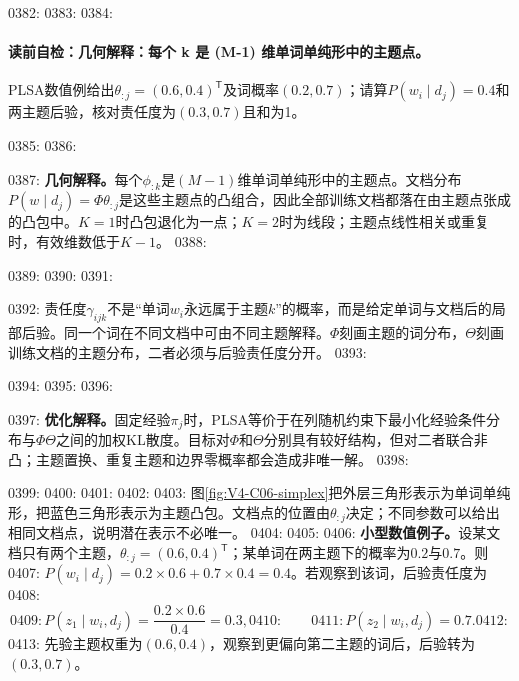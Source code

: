 0382: \label{struct:V4-C06-CH14}
0383: %
0384: \paragraph{读前自检：几何解释：每个 k 是 (M-1) 维单词单纯形中的主题点。}PLSA数值例给出$\theta_{:j}=(0.6,0.4)^{\mathsf T}$及词概率$(0.2,0.7)$；请算$P(w_i\mid d_j)=0.4$和两主题后验，核对责任度为$(0.3,0.7)$且和为1。\par
0385: 
0386: \begin{geometrybox}
0387: \textbf{几何解释。}每个$\phi_{:k}$是$(M-1)$维单词单纯形中的主题点。文档分布$P(w\mid d_j)=\Phi\theta_{:j}$是这些主题点的凸组合，因此全部训练文档都落在由主题点张成的凸包中。$K=1$时凸包退化为一点；$K=2$时为线段；主题点线性相关或重复时，有效维数低于$K-1$。
0388: \end{geometrybox}
0389: 
0390: \label{struct:V4-C06-CH15}
0391: \begin{probabilitybox}
0392: 责任度$\gamma_{ijk}$不是“单词$w_i$永远属于主题$k$”的概率，而是给定单词与文档后的局部后验。同一个词在不同文档中可由不同主题解释。$\Phi$刻画主题的词分布，$\Theta$刻画训练文档的主题分布，二者必须与后验责任度分开。
0393: \end{probabilitybox}
0394: 
0395: \label{struct:V4-C06-CH16}
0396: \begin{optimizationbox}
0397: \textbf{优化解释。}固定经验$\pi_j$时，PLSA等价于在列随机约束下最小化经验条件分布与$\Phi\Theta$之间的加权KL散度。目标对$\Phi$和$\Theta$分别具有较好结构，但对二者联合非凸；主题置换、重复主题和边界零概率都会造成非唯一解。
0398: \end{optimizationbox}
0399: 
0400: \label{struct:V4-C06-CH17}
0401: %
0402: 
0403: 图\ref{fig:V4-C06-simplex}把外层三角形表示为单词单纯形，把蓝色三角形表示为主题凸包。文档点的位置由$\theta_{:j}$决定；不同参数可以给出相同文档点，说明潜在表示不必唯一。
0404: 
0405: \label{struct:V4-C06-CH18}
0406: \textbf{小型数值例子。}设某文档只有两个主题，$\theta_{:j}=(0.6,0.4)^{\mathsf T}$；某单词在两主题下的概率为$0.2$与$0.7$。则
0407: $P(w_i\mid d_j)=0.2\times0.6+0.7\times0.4=0.4$。若观察到该词，后验责任度为
0408: \[
0409: P(z_1\mid w_i,d_j)=\frac{0.2\times0.6}{0.4}=0.3,
0410: \qquad
0411: P(z_2\mid w_i,d_j)=0.7.
0412: \]
0413: 先验主题权重为$(0.6,0.4)$，观察到更偏向第二主题的词后，后验转为$(0.3,0.7)$。
